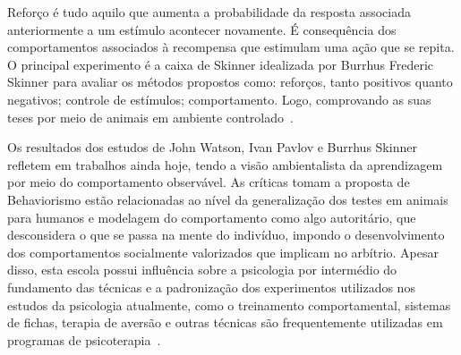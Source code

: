 Reforço é tudo aquilo que aumenta a probabilidade da resposta associada anteriormente a um estímulo acontecer novamente. É consequência dos comportamentos associados à recompensa que estimulam uma ação que se repita.
O principal experimento é a caixa de Skinner idealizada por Burrhus Frederic Skinner para avaliar os  métodos propostos como: reforços, tanto positivos quanto negativos; controle de estímulos; comportamento.
Logo, comprovando as suas teses por meio de animais em ambiente controlado~\cite{silva2007psicologia_educacao}.

Os resultados dos estudos de John Watson, Ivan Pavlov e Burrhus Skinner refletem em trabalhos ainda hoje, tendo a visão ambientalista da aprendizagem por meio do comportamento observável. 
As críticas tomam a proposta de Behaviorismo estão relacionadas ao nível da generalização dos testes em animais para humanos e modelagem do comportamento como algo autoritário, que desconsidera o que se passa na mente do indivíduo, impondo o desenvolvimento dos comportamentos socialmente valorizados que implicam no arbítrio.
Apesar disso, esta escola possui influência sobre a psicologia por intermédio do fundamento das técnicas e a padronização dos experimentos utilizados nos estudos da psicologia atualmente, como o treinamento comportamental, sistemas de fichas, terapia de aversão e outras técnicas são frequentemente utilizadas em programas de psicoterapia~\cite{sternberg2000psicologia}.
